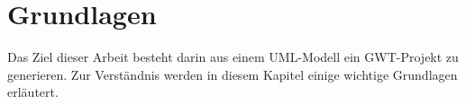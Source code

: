 \chapter{Grundlagen}
\label{Grundlagen}
Das Ziel dieser Arbeit besteht darin aus einem UML-Modell ein GWT-Projekt zu
generieren. Zur Verständnis werden in diesem Kapitel einige wichtige
Grundlagen erläutert.





